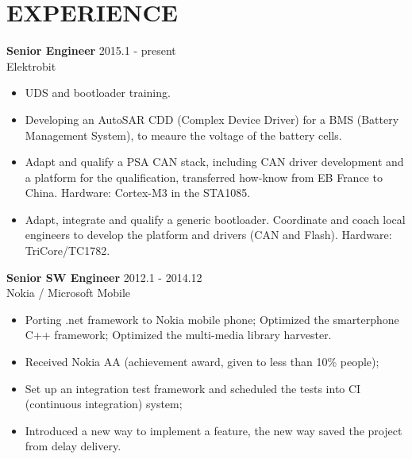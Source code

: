 
\section{EXPERIENCE}
\textbf{Senior Engineer} \hfill 2015.1 - present \\
        Elektrobit
        \begin{itemize}  \itemsep -2pt %
        \item UDS and bootloader training.
        \item Developing an AutoSAR CDD (Complex Device Driver) for a BMS (Battery Management System),
              to meaure the voltage of the battery cells.
        \item Adapt and qualify a PSA CAN stack, including CAN driver development and a platform for the qualification,
              transferred how-know from EB France to China.
              Hardware: Cortex-M3 in the STA1085.
        \item Adapt, integrate and qualify a generic bootloader.
              Coordinate and coach local engineers to develop the platform and drivers (CAN and Flash).
              Hardware: TriCore/TC1782.
        \end{itemize}

\textbf{Senior SW Engineer} \hfill 2012.1 - 2014.12\\
        Nokia / Microsoft Mobile
        \begin{itemize}  \itemsep -2pt %
        \item Porting .net framework to Nokia mobile phone;
        Optimized the smarterphone C++ framework;
        Optimized the multi-media library harvester.
        \item Received Nokia AA (achievement award, given to less than 10\% people);
        \item Set up an integration test framework
        and scheduled the tests into CI (continuous integration) system;
        \item Introduced a new way to implement a feature,
        the new way saved the project from delay delivery.
        \end{itemize}


